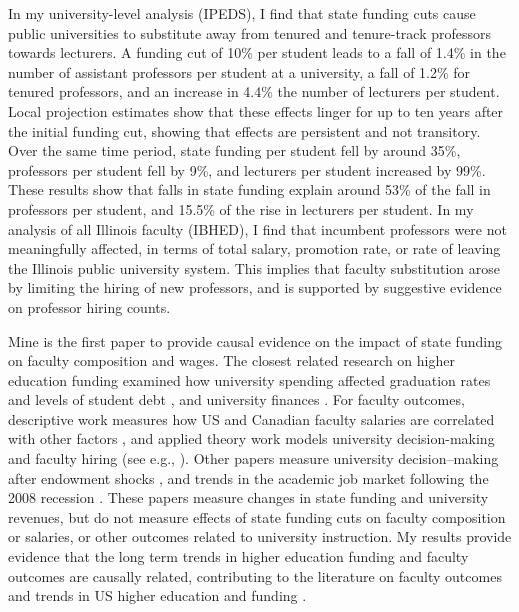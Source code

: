 In my university-level analysis (IPEDS), I find that state funding cuts cause public universities to substitute away from tenured and tenure-track professors towards lecturers.
A funding cut of 10\% per student leads to a fall of 1.4\% in the number of assistant professors per student at a university, a fall of 1.2\% for tenured professors, and an increase in 4.4\% the number of lecturers per student.
Local projection estimates show that these effects linger for up to ten years after the initial funding cut, showing that effects are persistent and not transitory.
Over the same time period, state funding per student fell by around 35\%, professors per student fell by 9\%, and lecturers per student increased by 99\%.
These results show that falls in state funding explain around 53\% of the fall in professors per student,
and 15.5\% of the rise in lecturers per student.
In my analysis of all Illinois faculty (IBHED), I find that incumbent professors were not meaningfully affected, in terms of total salary, promotion rate, or rate of leaving the Illinois public university system.
This implies that faculty substitution arose by limiting the hiring of new professors, and is supported by suggestive evidence on professor hiring counts.

Mine is the first paper to provide causal evidence on the impact of state funding on faculty composition and wages.
The closest related research on higher education funding examined how university spending affected graduation rates and levels of student debt \citep{NBERw23736,NBERw27885}, and university finances \citep{miller2022making,bound2019public,brown2014endowment}.
For faculty outcomes, descriptive work measures how US and Canadian faculty salaries are correlated with other factors \citep{bratsberg2003negative,martinello2009faculty,pfeffer1992salary}, and applied theory work models university decision-making and faculty hiring (see e.g., \citealt{abe2015implications,johnson2009jep,NBERc13879}).
Other papers measure university decision--making after endowment shocks \citep{brown2014endowment}, and trends in the academic job market following the 2008 recession \citep{turner2014impact}.
These papers measure changes in state funding and university revenues, but do not measure effects of state funding cuts on faculty composition or salaries, or other outcomes related to university instruction.
My results provide evidence that the long term trends in higher education funding and faculty outcomes are causally related, contributing to the literature on faculty outcomes \citep{ehrenberg2003studying} and trends in US higher education and funding \citep{hoxby2009changing,ehrenberg2012american}.

